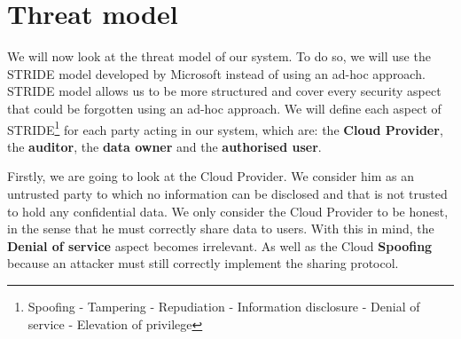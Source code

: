 \documentclass[../main.tex]{subfiles}
\begin{document}
\section{Threat model}
\label{section:problem:threat_model}

\par We will now look at the threat model of our system. To do so, we will use the STRIDE model developed by Microsoft instead of using an ad-hoc approach. STRIDE model allows us to be more structured and cover every security aspect that could be forgotten using an ad-hoc approach. We will define each aspect of STRIDE\footnote{Spoofing - Tampering - Repudiation - Information disclosure - Denial of service - Elevation of privilege} for each party acting in our system, which are: the \textbf{Cloud Provider}, the \textbf{auditor}, the \textbf{data owner} and the \textbf{authorised user}.\\

\par Firstly, we are going to look at the Cloud Provider. We consider him as an untrusted party to which no information can be disclosed and that is not trusted to hold any confidential data. We only consider the Cloud Provider to be honest, in the sense that he must correctly share data to users. With this in mind, the \textbf{Denial of service} aspect becomes irrelevant. As well as the Cloud \textbf{Spoofing} because an attacker must still correctly implement the sharing protocol.\\
\end{document}
